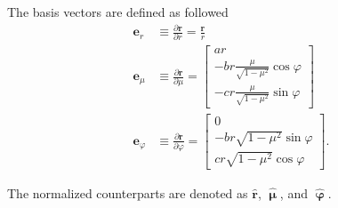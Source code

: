 The basis vectors are defined as followed
\begin{subequations}
    \begin{align}
        \mathbf{e}_r &\equiv \frac{\partial\mathbf{r}}{\partial r} = \frac{\mathbf{r}}{r} \\
        \mathbf{e}_\mu &\equiv \frac{\partial\mathbf{r}}{\partial \mu} =
            \begin{bmatrix}
                ar \\ \displaystyle -br \frac{\mu}{\sqrt{1-\mu^2}} \cos\varphi \\ \displaystyle -cr \frac{\mu}{\sqrt{1-\mu^2}} \sin\varphi
            \end{bmatrix} \\
        \mathbf{e}_\varphi &\equiv \frac{\partial\mathbf{r}}{\partial \varphi} =
            \begin{bmatrix}
                0 \\ -br \sqrt{1-\mu^2} \sin\varphi \\ cr \sqrt{1-\mu^2} \cos\varphi
            \end{bmatrix}.
    \end{align}
\end{subequations}

The normalized counterparts are denoted as $\mathbf{\hat{r}}$, $\bm{\hat{\upmu}}$, and $\bm{\hat{\upvarphi}}$.